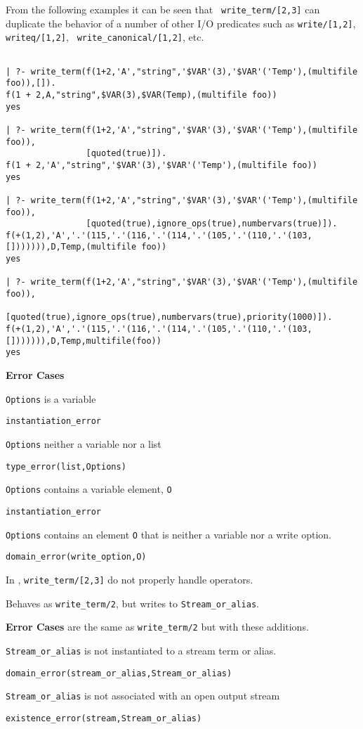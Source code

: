 \begin{description}
From the following examples it can be seen that {\tt
write\_term/[2,3]} can duplicate the behavior of a number of other
I/O predicates such as {\tt write/[1,2]}, {\tt writeq/[1,2]}, {\tt
write\_canonical/[1,2]}, etc.
{\small
\begin{verbatim}

| ?- write_term(f(1+2,'A',"string",'$VAR'(3),'$VAR'('Temp'),(multifile foo)),[]).
f(1 + 2,A,"string",$VAR(3),$VAR(Temp),(multifile foo))
yes

| ?- write_term(f(1+2,'A',"string",'$VAR'(3),'$VAR'('Temp'),(multifile foo)),
                [quoted(true)]).
f(1 + 2,'A',"string",'$VAR'(3),'$VAR'('Temp'),(multifile foo))
yes

| ?- write_term(f(1+2,'A',"string",'$VAR'(3),'$VAR'('Temp'),(multifile foo)),
                [quoted(true),ignore_ops(true),numbervars(true)]).
f(+(1,2),'A','.'(115,'.'(116,'.'(114,'.'(105,'.'(110,'.'(103,[])))))),D,Temp,(multifile foo))
yes

| ?- write_term(f(1+2,'A',"string",'$VAR'(3),'$VAR'('Temp'),(multifile foo)),
                [quoted(true),ignore_ops(true),numbervars(true),priority(1000)]).
f(+(1,2),'A','.'(115,'.'(116,'.'(114,'.'(105,'.'(110,'.'(103,[])))))),D,Temp,multifile(foo))
yes
\end{verbatim}
}

{\bf Error Cases} 
\bi
\item 	{\tt Options} is a variable
\bi
\item    {\tt instantiation\_error}
\ei
\item 	{\tt Options} neither a variable nor a list
\bi
\item    {\tt type\_error(list,Options)}
\ei
\item 	{\tt Options} contains a variable element, {\tt O}
\bi
\item    {\tt instantiation\_error}
\ei
\item 	{\tt Options} contains an element {\tt O} that is neither a variable
nor a write option.
\bi
\item    {\tt domain\_error(write\_option,O)}
\ei
\ei

\compatability In \version{}, {\tt write\_term/[2,3]} do not properly
handle operators.

% 
Behaves as {\tt write\_term/2}, but writes to {\tt Stream\_or\_alias}.

{\bf Error Cases} are the same as {\tt write\_term/2} but with these
additions.
\bi
\item 	{\tt Stream\_or\_alias} is not instantiated to a stream term
or alias.
\bi
\item 	{\tt domain\_error(stream\_or\_alias,Stream\_or\_alias)}
\ei
\item 	{\tt Stream\_or\_alias} is not associated with an open output stream
\bi
\item 	{\tt existence\_error(stream,Stream\_or\_alias)}
\ei
\ei



\end{description}
